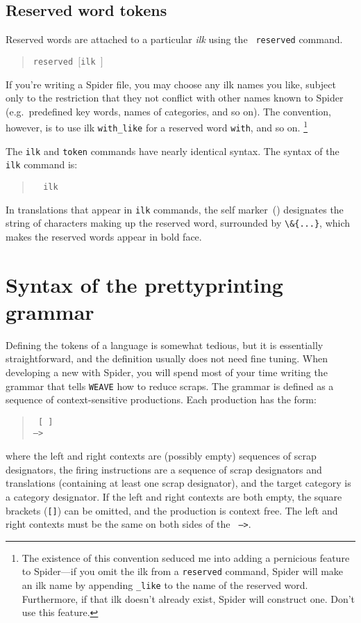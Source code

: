 \subsection{Reserved word tokens}
Reserved words are attached to a particular {\em ilk} using the {\tt
reserved} command.
\begin{quote}
\tt  reserved  $[$ilk $]$
\end{quote}
If you're writing a {Spider} file, you may choose any ilk
names you like, subject only to the restriction that they not conflict
with other names known to {Spider} (e.g.~predefined key words,
names of categories, and so on).
The convention, however, is to use ilk {\tt with\_like} for a reserved
word {\tt with}, and so on.%
\footnote{%
The existence of this convention seduced me into adding a pernicious
feature to {Spider}---if you omit the ilk from a {\tt reserved}
command, {Spider} will make an ilk name by appending {\tt \_like}
to the name of the reserved word.
Furthermore, if that ilk doesn't already exist, {Spider} will
construct one.
Don't use this feature.
}

The {\tt  ilk} and {\tt  token} commands have nearly identical syntax.
The syntax of the {\tt ilk} command is:
\begin{quote}\tt
{} \produces~ilk 
\end{quote}
In translations that appear in {\tt ilk} commands, the self
marker~({\tt *}) designates the string of characters making up the
reserved word, surrounded by \verb+\&{...}+, which makes the reserved
words appear in bold face.

\section{Syntax of the prettyprinting grammar}
Defining the tokens of a language is somewhat tedious, but it is
essentially straightforward, and the definition usually does not need
fine tuning.
When developing a new {\WEB} with {Spider}, you will spend most of
your time writing the grammar that tells {\tt WEAVE} how to reduce
scraps.
The grammar is defined as a sequence of context-sensitive productions. 
Each production has the form:
\begin{quote}
\tt 
{} [  ] 
\\\null\qquad
-->   
\end{quote}
where the left and right contexts are (possibly empty) sequences of
scrap designators, the firing instructions are a sequence of scrap
designators and translations (containing at least one scrap
designator), and the target category is a category designator.
If the left and right contexts are both empty, the square brackets
({\tt []}) can be omitted, and the production is context free.
The left and right contexts must be the same on both sides of the {\tt
-->}.

